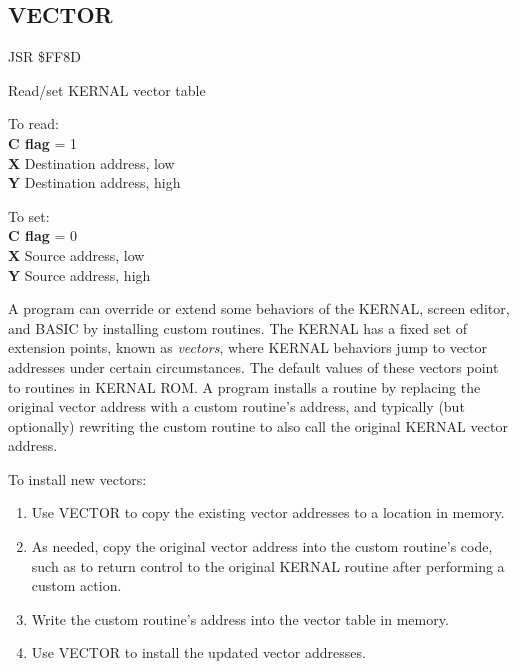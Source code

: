 \subsection{VECTOR}
\label{KERNAL Jump Table!VECTOR}
\begin{description}[leftmargin=2cm,style=nextline]
    \item [Address:] JSR \$FF8D
    \item [Description:] Read/set KERNAL vector table
    \item [Inputs:]
        To read: \\
        \textbf{C flag} = 1 \\
        \textbf{X} Destination address, low \\
        \textbf{Y} Destination address, high

        To set: \\
        \textbf{C flag} = 0 \\
        \textbf{X} Source address, low \\
        \textbf{Y} Source address, high

    \item [Remarks:]
        A program can override or extend some behaviors of the KERNAL, screen editor, and BASIC by installing custom routines. The KERNAL has a fixed set of extension points, known as \emph{vectors}, where KERNAL behaviors jump to vector addresses under certain circumstances. The default values of these vectors point to routines in KERNAL ROM. A program installs a routine by replacing the original vector address with a custom routine's address, and typically (but optionally) rewriting the custom routine to also call the original KERNAL vector address.

        To install new vectors:

        \begin{enumerate}
            \item Use VECTOR to copy the existing vector addresses to a location in memory.
            \item As needed, copy the original vector address into the custom routine's code, such as to return control to the original KERNAL routine after performing a custom action.
            \item Write the custom routine's address into the vector table in memory.
            \item Use VECTOR to install the updated vector addresses.
        \end{enumerate}


\end{description}
